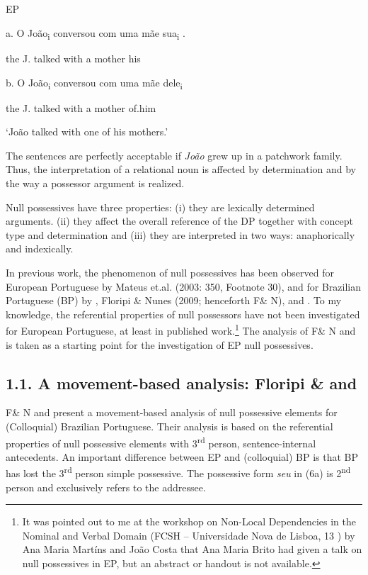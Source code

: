 \documentclass[output=paper]{langsci/langscibook}
\begin{document}
\ea%
    \label{ex:key:5}
    \gll\\
        \\
    \glt
    \z

          EP

  a.  O João\textsubscript{i} conversou com uma mãe sua\textsubscript{i} .  

the J.   talked   with a mother his

b.  O João\textsubscript{i} conversou com uma mãe dele\textsubscript{i}

the J. talked    with a mother of.him

‘João talked with one of his mothers.’

The sentences are perfectly acceptable if \textit{João} grew up in a patchwork family. Thus, the interpretation of a relational noun is affected by determination and by the way a possessor argument is realized.

Null possessives have three properties: (i) they are lexically determined arguments. (ii) they affect the overall reference of the DP together with concept type and determination and (iii) they are interpreted in two ways: anaphorically and indexically.

In previous work, the phenomenon of null possessives has been observed for European Portuguese by Mateus et.al. (2003: 350, Footnote 30), and for Brazilian Portuguese (BP) by \citet{Floripi2003}, Floripi \& Nunes (2009; henceforth F\& N), and \citet{Rodrigues2010}. To my knowledge, the referential properties of null possessors have not been investigated for European Portuguese, at least in published work.\footnote{It was pointed out to me at the workshop on Non-Local Dependencies in the Nominal and Verbal Domain (FCSH – Universidade Nova de Lisboa, 13 \citealt{November2015}) by Ana Maria Martíns and João Costa that Ana Maria Brito had given a talk on null possessives in EP, but an abstract or handout is not available.} The analysis of F\& N and \citet{Rodrigues2010} is taken as a starting point for the investigation of EP null possessives.

\subsection{ 1.1. A movement-based analysis: Floripi \& \citet{Nunes2009} and \citet{Rodrigues2010}}

F\& N and \citet{Rodrigues2010} present a movement-based analysis of null possessive elements for (Colloquial) Brazilian Portuguese. Their analysis is based on the referential properties of null possessive elements with 3\textsuperscript{rd} person, sentence-internal antecedents. An important difference between EP and (colloquial) BP is that BP has lost the 3\textsuperscript{rd} person simple possessive. The possessive form \textit{seu} in (6a) is 2\textsuperscript{nd} person and exclusively refers to the addressee.
\end{document}
